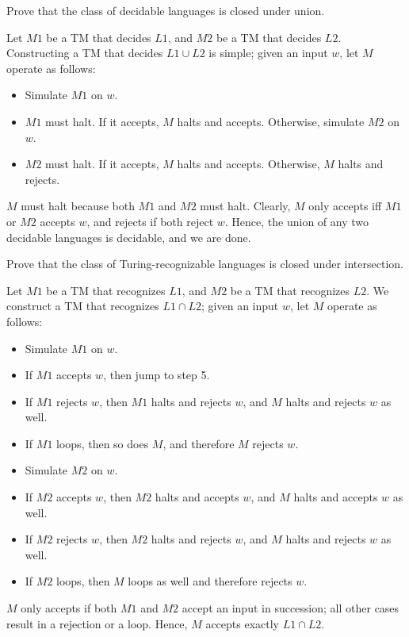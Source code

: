 \documentclass[solution, letterpaper]{cs121}
\begin{document}



Prove that the class of decidable languages is closed under union.

\begin{solution}
Let $M1$ be a TM that decides $L1$, and $M2$ be a TM that decides $L2$.  Constructing a TM that decides $L1 \cup L2$ is simple; given an input $w$, let $M$ operate as follows:
\begin{itemize}
	\setlength\itemsep{0cm}
	\item Simulate $M1$ on $w$.
	\item $M1$ must halt.  If it accepts, $M$ halts and accepts.  Otherwise, simulate $M2$ on $w$.
	\item $M2$ must halt.  If it accepts, $M$ halts and accepts.  Otherwise, $M$ halts and rejects.
\end{itemize}

$M$ must halt because both $M1$ and $M2$ must halt.  Clearly, $M$ only accepts iff $M1$ or $M2$ accepts $w$, and rejects if both reject $w$.  Hence, the union of any two decidable languages is decidable, and we are done.
\end{solution}


Prove that the class of Turing-recognizable languages is closed under intersection.

\begin{solution}
Let $M1$ be a TM that recognizes $L1$, and $M2$ be a TM that recognizes $L2$.  We construct a TM that recognizes $L1 \cap L2$; given an input $w$, let $M$ operate as follows:
\begin{itemize}
	\setlength\itemsep{0cm}
	\item Simulate $M1$ on $w$.
	\item If $M1$ accepts $w$, then jump to step 5.
	\item If $M1$ rejects $w$, then $M1$ halts and rejects $w$, and $M$ halts and rejects $w$ as well.
	\item If $M1$ loops, then so does $M$, and therefore $M$ rejects $w$.
	\item Simulate $M2$ on $w$.
	\item If $M2$ accepts $w$, then $M2$ halts and accepts $w$, and $M$ halts and accepts $w$ as well.
	\item If $M2$ rejects $w$, then $M2$ halts and rejects $w$, and $M$ halts and rejects $w$ as well.
	\item If $M2$ loops, then $M$ loops as well and therefore rejects $w$.
\end{itemize}

$M$ only accepts if both $M1$ and $M2$ accept an input in succession; all other cases result in a rejection or a loop.  Hence, $M$ accepts exactly $L1 \cap L2$.
\end{solution}
\end{document}
